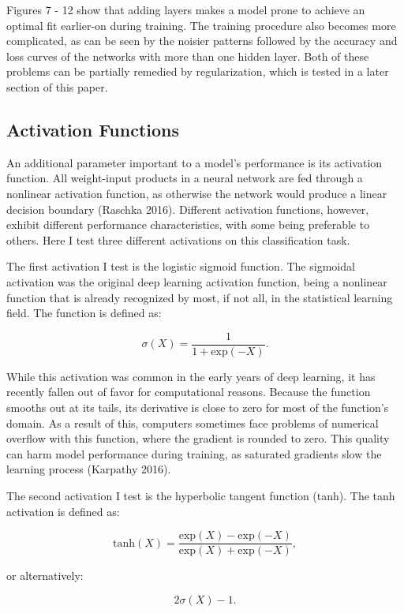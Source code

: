 \documentclass[12pt]{article}  %
\theoremstyle{definition}
\theoremstyle{remark}
\begin{document}
\par  Figures 7 - 12 show that adding layers makes a model prone to achieve an optimal fit earlier-on during training. The training procedure also becomes more complicated, as can be seen by the noisier patterns followed by the accuracy and loss curves of the networks with more than one hidden layer. Both of these problems can be partially remedied by regularization, which is tested in a later section of this paper. 

\subsection{Activation Functions}
\par An additional parameter important to a model's performance is its activation function. All weight-input products in a neural network are fed through a nonlinear activation function, as otherwise the network would produce a linear decision boundary (Raschka 2016). Different activation functions, however, exhibit different performance characteristics, with some being preferable to others. Here I test three different activations on this classification task.
\par The first activation I test is the logistic sigmoid function. The sigmoidal activation was the original deep learning activation function, being a nonlinear function that is already recognized by most, if not all, in the statistical learning field. The function is defined as:

$$\sigma{(X)} = \frac{1}{1+\text{exp}(-X)}.$$

\par While this activation was common in the early years of deep learning, it has recently fallen out of favor for computational reasons. Because the function smooths out at its tails, its derivative is close to zero for most of the function's domain. As a result of this, computers sometimes face problems of numerical overflow with this function, where the gradient is rounded to zero. This quality can harm model performance during training, as saturated gradients slow the learning process (Karpathy 2016). 
\par The second activation I test is the hyperbolic tangent function (tanh). The tanh activation is defined as:

$$\text{tanh}(X)=\frac{\text{exp}(X)-\text{exp}(-X)}{\text{exp}(X)+\text{exp}(-X)}, $$

or alternatively:

$$ 2\sigma{(X)} - 1. $$
\end{document}
